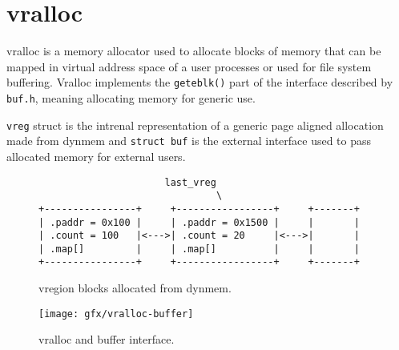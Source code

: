 \chapter{vralloc}

\acf{vralloc} is a memory allocator used to allocate blocks of memory
that can be mapped in virtual address space of a user processes or used for
file system buffering. Vralloc implements the \verb+geteblk()+ part of the interface
described by \verb+buf.h+, meaning allocating memory for generic use.

\verb+vreg+ struct is the intrenal representation of a generic page aligned
allocation made from dynmem and \verb+struct buf+ is the external interface
used to pass allocated memory for external users.

\begin{figure}
\begin{verbatim}
                      last_vreg
                               \
+----------------+     +-----------------+     +-------+
| .paddr = 0x100 |     | .paddr = 0x1500 |     |       |
| .count = 100   |<--->| .count = 20     |<--->|       |
| .map[]         |     | .map[]          |     |       |
+----------------+     +-----------------+     +-------+
\end{verbatim}
\caption{vregion blocks allocated from dynmem.}
\label{figure:vralloc_blocks}
\end{figure}

\begin{figure}
  \center
  \texttt{[image: gfx/vralloc-buffer]}
  \caption{vralloc and buffer interface.}
  \label{figure:vrregbufapi}
\end{figure}
